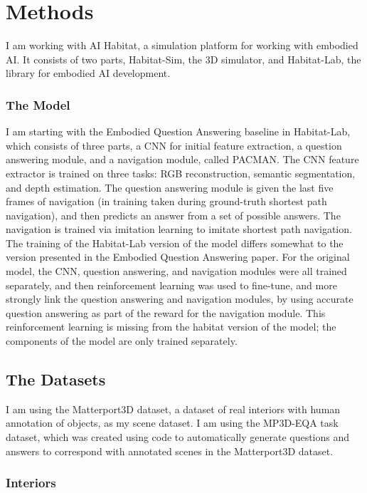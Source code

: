 \chapter{Methods}
I am working with AI Habitat, a simulation platform for working with embodied AI\cite{habitat19iccv}. It consists of two parts, Habitat-Sim, the 3D simulator, and Habitat-Lab, the library for embodied AI development. 

\subsection{The Model}
I am starting with the Embodied Question Answering baseline in Habitat-Lab, which consists of three parts, a CNN for initial feature extraction, a question answering module, and a navigation module, called PACMAN\cite{embodiedqa}.
The CNN feature extractor is trained on three tasks: RGB reconstruction, semantic segmentation, and depth estimation.
The question answering module is given the last five frames of navigation (in training taken during ground-truth shortest path navigation), and then predicts an answer from a set of possible answers. 
The navigation is trained via imitation learning to imitate shortest path navigation.  
The training of the Habitat-Lab version of the model differs somewhat to the version presented in the Embodied Question Answering paper. For the original model, the CNN, question answering, and navigation modules were all trained separately, and then reinforcement learning was used to fine-tune, and more strongly link the question answering and navigation modules, by using accurate question answering as part of the reward for the navigation module. This reinforcement learning is missing from the habitat version of the model; the components of the model are only trained separately. 

\section{The Datasets}
I am using the Matterport3D dataset, a dataset of real interiors with human annotation of objects, as my scene dataset\cite{matterport}. 
I am using the MP3D-EQA task dataset, which was created using code to automatically generate questions and answers to correspond with annotated scenes in the Matterport3D dataset\cite{eqa_matterport}. 
\subsection{Interiors}

